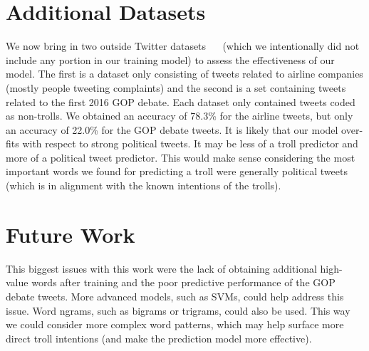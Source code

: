 \documentclass[runningheads]{llncs}
\begin{document}
\section{Additional Datasets}
We now bring in two outside Twitter datasets ~\cite{ref_url2}~\cite{ref_url3} (which we intentionally did not include any portion in our training model) to assess the effectiveness of our model. The first is a dataset only consisting of tweets related to airline companies (mostly people tweeting complaints) and the second is a set containing tweets related to the first 2016 GOP debate. Each dataset only contained tweets coded as non-trolls.
We obtained an accuracy of 78.3\% for the airline tweets, but only an accuracy of 22.0\% for the GOP debate tweets. It is likely that our model over-fits with respect to strong political tweets. It may be less of a troll predictor and more of a political tweet predictor. This would make sense considering the most important words we found for predicting a troll were generally political tweets (which is in alignment with the known intentions of the trolls).

\section{Future Work}
This biggest issues with this work were the lack of obtaining additional high-value words after training and the poor predictive performance of the GOP debate tweets. More advanced models, such as SVMs, could help address this issue. Word ngrams, such as bigrams or trigrams, could also be used. This way we could consider more complex word patterns, which may help surface more direct troll intentions (and make the prediction model more effective).
\end{document}
